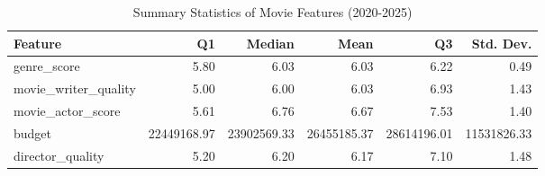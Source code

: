 \begin{table}
\caption{Summary Statistics of Movie Features (2020-2025)}
\label{tab:movie_features_stats}
\begin{tabular}{lrrrrr}
\toprule
Feature & Q1 & Median & Mean & Q3 & Std. Dev. \\
\midrule
genre\_score & 5.80 & 6.03 & 6.03 & 6.22 & 0.49 \\
movie\_writer\_quality & 5.00 & 6.00 & 6.03 & 6.93 & 1.43 \\
movie\_actor\_score & 5.61 & 6.76 & 6.67 & 7.53 & 1.40 \\
budget & 22449168.97 & 23902569.33 & 26455185.37 & 28614196.01 & 11531826.33 \\
director\_quality & 5.20 & 6.20 & 6.17 & 7.10 & 1.48 \\
\bottomrule
\end{tabular}
\end{table}
